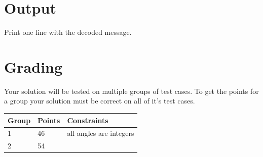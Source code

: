 \section*{Output}
Print one line with the decoded message.

\section*{Grading}
Your solution will be tested on multiple groups of test cases. To get the points for a group your solution must be correct on all of it's test cases.

\begin{tabular}{| l | l | l |}
	\hline
	Group & Points & Constraints\\ \hline
  1     & 46         & all angles are integers \\ \hline
  2     & 54         & \\ \hline
\end{tabular}
